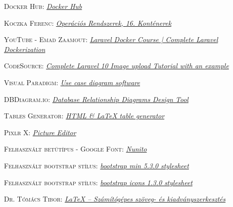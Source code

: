 \documentclass[
]{thesis-ekf}
\theoremstyle{definition}
\theoremstyle{remark}
\begin{document}
\begin{thebibliography}{2}
\textsc{Docker Hub}: \href{https://hub.docker.com/}
{
	\emph{Docker Hub}
}

\textsc{Koczka Ferenc}: \href{https://oprendszer.koczka.com/_static/kontenerek/kontenerek.html}
{
	\emph{Operációs Rendszerek, 16. Konténerek}
}

\textsc{YouTube - Emad Zaamout}: 
\href{https://www.youtube.com/watch?v=WahJ91Nrgn0}
{
	\emph{Laravel Docker Course | Complete Laravel Dockerization}
}

\textsc{CodeSource}: 
\href{https://codesource.io/complete-laravel-8-image-upload-tutorial-with-example/}
{
	\emph{Complete Laravel 10 Image upload Tutorial with an example}
}

\textsc{Visual Paradigm}: 
\href{https://online.visual-paradigm.com/diagrams/features/use-case-diagram-software/}
{
	\emph{Use case diagram software}
}

\textsc{DBDiagram.io}: 
\href{https://dbdiagram.io/d}
{
	\emph{Database Relationship Diagrams Design Tool}
}

\textsc{Tables Generator}: 
\href{https://www.tablesgenerator.com/}
{
	\emph{HTML \& LaTeX table generator}
}

\textsc{Pixlr X}: 
\href{https://pixlr.com/x/}
{
	\emph{Picture Editor}
}

\textsc{Felhasznált betűtípus - Google Font}: 
\href{https://fonts.googleapis.com/css?family=Nunito}
{
	\emph{Nunito}
}

\textsc{Felhasznált bootstrap stílus}: 
\href{https://cdn.jsdelivr.net/npm/bootstrap@5.3.0/dist/css/bootstrap.min.css}
{
	\emph{bootstrap min 5.3.0 stylesheet}
}

\textsc{Felhasznált bootstrap stílus}: 
\href{https://cdn.jsdelivr.net/npm/bootstrap-icons@1.3.0/font/bootstrap-icons.css}
{
	\emph{bootstrap icons 1.3.0 stylesheet}
}

\textsc{Dr. Tómács Tibor}: 
\href{https://tomacstibor.uni-eszterhazy.hu/latex.html}
{
	\emph{LaTeX – Számítógépes szöveg- és kiadványszerkesztés}
}


\end{thebibliography}


\end{document}
